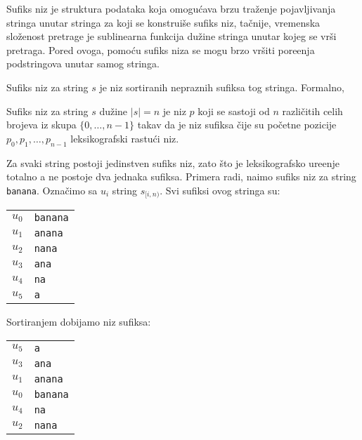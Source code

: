 
Sufiks niz je struktura podataka koja omogu\' cava brzu tra\v zenje pojavljivanja stringa unutar stringa za koji se konstrui\v se sufiks niz, ta\v cnije, vremenska slo\v zenost pretrage je sublinearna funkcija du\v zine stringa unutar kojeg se vr\v si pretraga. Pored ovoga, pomo\' cu sufiks niza se mogu brzo vr\v siti pore\dj enja podstringova unutar samog stringa.

Sufiks niz za string $s$ je niz sortiranih nepraznih sufiksa tog stringa. Formalno,

\begin{dfn}
Sufiks niz za string $s$ du\v zine $|s| = n$ je niz $p$ koji se sastoji od $n$ razli\v citih celih brojeva iz skupa $\{0,\ldots,n-1\}$ takav da je niz sufiksa \v cije su po\v cetne pozicije $p_0, p_1, \ldots, p_{n-1}$ leksikografski rastu\' ci niz.
\end{dfn}

Za svaki string postoji jedinstven sufiks niz, zato \v sto je leksikografsko ure\dj enje totalno a ne postoje dva jednaka sufiksa. Primera radi, na\dj imo sufiks niz za string \texttt{banana}. Ozna\v cimo sa $u_i$ string $s_{[i,n)}$. Svi sufiksi ovog stringa su:

\begin{center}
\begin{tabular}{cl}
    $u_0$ & \texttt{banana} \\
    $u_1$ & \texttt{anana} \\
    $u_2$ & \texttt{nana} \\
    $u_3$ & \texttt{ana} \\
    $u_4$ & \texttt{na} \\
    $u_5$ & \texttt{a} \\
\end{tabular}
\end{center}

Sortiranjem dobijamo niz sufiksa:

\begin{center}
\begin{tabular}{cl}
    $u_5$ & \texttt{a} \\
    $u_3$ & \texttt{ana} \\
    $u_1$ & \texttt{anana} \\
    $u_0$ & \texttt{banana} \\
    $u_4$ & \texttt{na} \\
    $u_2$ & \texttt{nana} \\
\end{tabular}
\end{center}

